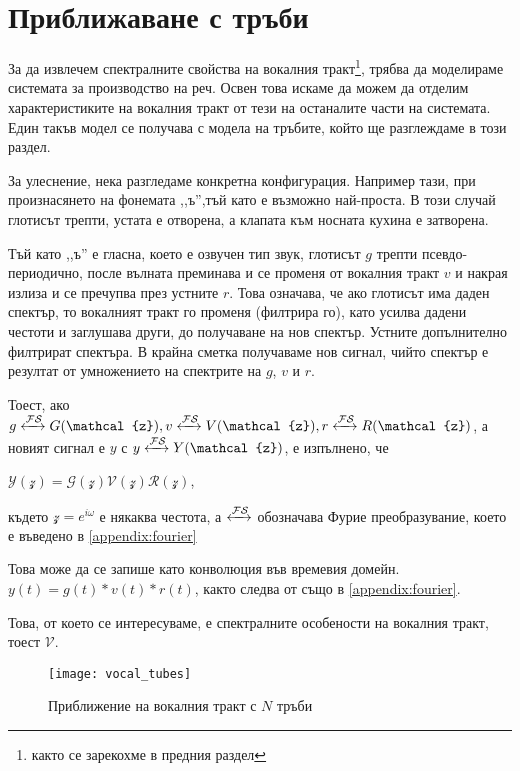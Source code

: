 \documentclass[main.tex]{subfiles}
\begin{document}
\section{Приближаване с тръби}
За да извлечем спектралните свойства на вокалния тракт\footnote{както се зарекохме в предния раздел}, трябва да моделираме системата за производство на реч. Освен това искаме да можем да отделим характеристиките на вокалния тракт от тези на останалите части на системата. Един такъв модел се получава с модела на тръбите, който ще разглеждаме в този раздел.

За улеснение, нека разгледаме конкретна конфигурация. Например тази, при произнасянето на фонемата ,,ъ'',тъй като е възможно най-проста. В този случай глотисът трепти, устата е отворена, а клапата към носната кухина е затворена.

Тъй като ,,ъ'' е гласна, което е озвучен тип звук, глотисът $g$ трепти псевдо-периодично, после вълната преминава и се променя от вокалния тракт $v$ и накрая излиза и се пречупва през устните $r$. Това означава, че ако глотисът има даден спектър, то вокалният тракт го променя (филтрира го), като усилва дадени честоти и заглушава други, до получаване на нов спектър. Устните допълнително филтрират спектъра. В крайна сметка получаваме нов сигнал, чийто спектър е резултат от умножението на спектрите на $g$, $v$ и $r$.

Тоест, ако $g \xleftrightarrow{\mathcal{F}\mathcal{S}} G(\mathcal{z}), v \xleftrightarrow{\mathcal{F}\mathcal{S}} V(\mathcal{z}), r \xleftrightarrow{\mathcal{F}\mathcal{S}} R(\mathcal{z})$, а новият сигнал е $y$ с $y \xleftrightarrow{\mathcal{F}\mathcal{S}} Y(\mathcal{z})$, е изпълнено, че

$\mathcal{Y}(\mathcal{z}) = \mathcal{G}(\mathcal{z}) \mathcal{V}(\mathcal{z}) \mathcal{R}(\mathcal{z})$,

където $\mathcal{z} = e^{i\omega}$ е някаква честота, а $\xleftrightarrow{\mathcal{F}\mathcal{S}}$ обозначава Фурие преобразувание, което е въведено в \autoref{appendix:fourier}

Това може да се запише като конволюция във времевия домейн. $y(t) = g(t)\ast v(t)\ast r(t)$, както следва от  също в \autoref{appendix:fourier}.

Това, от което се интересуваме, е спектралните особености на вокалния тракт, тоест $\mathcal{V}$.
\begin{figure}[ht]%
    \texttt{[image: vocal\_tubes]}%
    \caption{Приближение на вокалния тракт с $N$ тръби}%
    \label{fig:2:2:1}
\end{figure}
\end{document}
